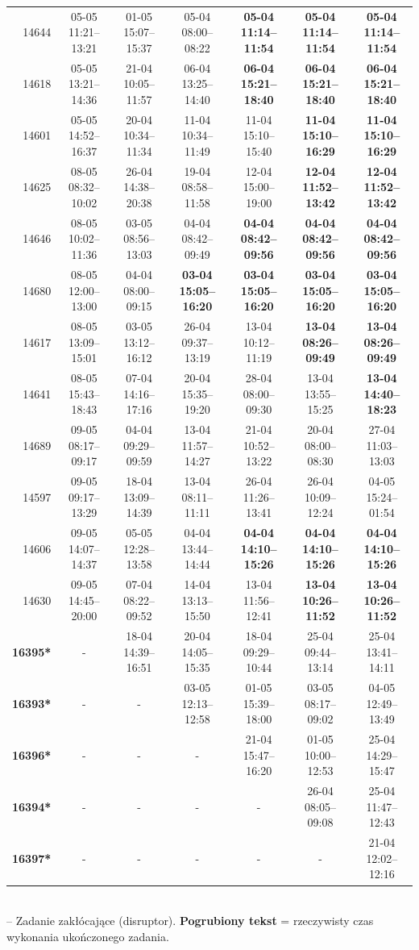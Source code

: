 \begin{table}[htbp]
\begin{tabular}{|r|c|c|c|c|c|c|}
14644 & 05-05 11:21--13:21 & 01-05 15:07--15:37 & 05-04 08:00--08:22 & \textbf{05-04 11:14--11:54} & \textbf{05-04 11:14--11:54} & \textbf{05-04 11:14--11:54} \\ 
14618 & 05-05 13:21--14:36 & 21-04 10:05--11:57 & 06-04 13:25--14:40 & \textbf{06-04 15:21--18:40} & \textbf{06-04 15:21--18:40} & \textbf{06-04 15:21--18:40} \\ 
14601 & 05-05 14:52--16:37 & 20-04 10:34--11:34 & 11-04 10:34--11:49 & 11-04 15:10--15:40 & \textbf{11-04 15:10--16:29} & \textbf{11-04 15:10--16:29} \\ 
14625 & 08-05 08:32--10:02 & 26-04 14:38--20:38 & 19-04 08:58--11:58 & 12-04 15:00--19:00 & \textbf{12-04 11:52--13:42} & \textbf{12-04 11:52--13:42} \\ 
14646 & 08-05 10:02--11:36 & 03-05 08:56--13:03 & 04-04 08:42--09:49 & \textbf{04-04 08:42--09:56} & \textbf{04-04 08:42--09:56} & \textbf{04-04 08:42--09:56} \\ 
14680 & 08-05 12:00--13:00 & 04-04 08:00--09:15 & \textbf{03-04 15:05--16:20} & \textbf{03-04 15:05--16:20} & \textbf{03-04 15:05--16:20} & \textbf{03-04 15:05--16:20} \\ 
14617 & 08-05 13:09--15:01 & 03-05 13:12--16:12 & 26-04 09:37--13:19 & 13-04 10:12--11:19 & \textbf{13-04 08:26--09:49} & \textbf{13-04 08:26--09:49} \\ 
14641 & 08-05 15:43--18:43 & 07-04 14:16--17:16 & 20-04 15:35--19:20 & 28-04 08:00--09:30 & 13-04 13:55--15:25 & \textbf{13-04 14:40--18:23} \\ 
14689 & 09-05 08:17--09:17 & 04-04 09:29--09:59 & 13-04 11:57--14:27 & 21-04 10:52--13:22 & 20-04 08:00--08:30 & 27-04 11:03--13:03 \\ 
14597 & 09-05 09:17--13:29 & 18-04 13:09--14:39 & 13-04 08:11--11:11 & 26-04 11:26--13:41 & 26-04 10:09--12:24 & 04-05 15:24--01:54 \\ 
14606 & 09-05 14:07--14:37 & 05-05 12:28--13:58 & 04-04 13:44--14:44 & \textbf{04-04 14:10--15:26} & \textbf{04-04 14:10--15:26} & \textbf{04-04 14:10--15:26} \\ 
14630 & 09-05 14:45--20:00 & 07-04 08:22--09:52 & 14-04 13:13--15:50 & 13-04 11:56--12:41 & \textbf{13-04 10:26--11:52} & \textbf{13-04 10:26--11:52} \\ 
\hline
\textbf{16395*} & - & 18-04 14:39--16:51 & 20-04 14:05--15:35 & 18-04 09:29--10:44 & 25-04 09:44--13:14 & 25-04 13:41--14:11 \\ 
\textbf{16393*} & - & - & 03-05 12:13--12:58 & 01-05 15:39--18:00 & 03-05 08:17--09:02 & 04-05 12:49--13:49 \\ 
\textbf{16396*} & - & - & - & 21-04 15:47--16:20 & 01-05 10:00--12:53 & 25-04 14:29--15:47 \\ 
\textbf{16394*} & - & - & - & - & 26-04 08:05--09:08 & 25-04 11:47--12:43 \\ 
\textbf{16397*} & - & - & - & - & - & 21-04 12:02--12:16 \\ 
\hline
\end{tabular}
\\ {\tiny * -- Zadanie zakłócające (disruptor). \textbf{Pogrubiony tekst} = rzeczywisty czas wykonania ukończonego zadania.}
\end{table}

